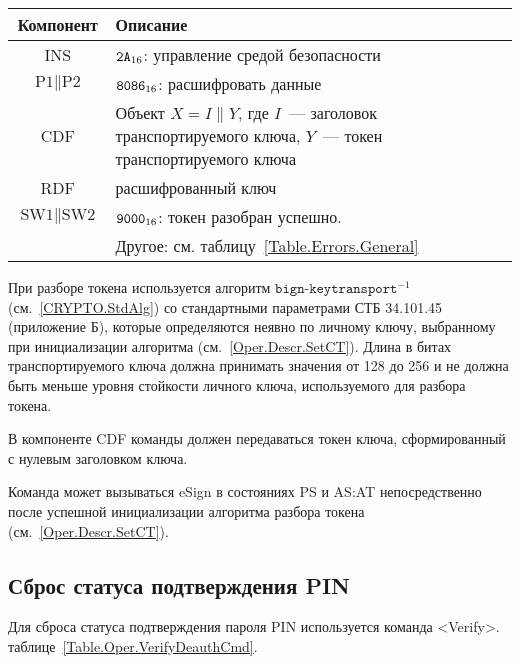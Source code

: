 \begin{table}[hbt]
\caption{}\label{Table.Oper.DecipherCmd}
\begin{tabular}{|c|p{14cm}|}
\hline
Компонент & Описание\\ 
\hline
\hline
INS & $\texttt{2A}_{16}$: управление средой безопасности \\
\hline
$\text{P1} \parallel \text{P2}$ & $\texttt{8086}_{16}$: расшифровать
данные \\ 
\hline
CDF & Объект $X=I \| Y$, где $I$~--- заголовок транспортируемого ключа, 
$Y$~--- токен транспортируемого ключа \\
\hline 
RDF &  расшифрованный ключ \\
\hline
$\text{SW1} \parallel \text{SW2}$ & $\texttt{9000}_{16}$: 
токен разобран успешно.\\
& Другое: см. таблицу~\ref{Table.Errors.General} \\
\hline
\end{tabular}
\end{table}

При разборе токена используется алгоритм $\texttt{bign-keytransport}^{-1}$
(см.~\ref{CRYPTO.StdAlg})
со стандартными параметрами СТБ 34.101.45 (приложение Б),
которые определяются неявно по личному ключу,
выбранному при инициализации алгоритма (см.~\ref{Oper.Descr.SetCT}).
Длина в битах транспортируемого ключа должна принимать значения
от 128 до 256 и не должна быть меньше уровня стойкости 
личного ключа, используемого для разбора токена.

В компоненте CDF команды должен передаваться токен ключа, 
сформированный с нулевым заголовком ключа. 

Команда может вызываться  eSign в состояниях 
PS и AS:AT непосредственно после успешной инициализации 
алгоритма разбора токена (см.~\ref{Oper.Descr.SetCT}).


\subsection{Сброс статуса подтверждения PIN}
\label{Oper.Descr.VerifyDeauth}

Для сброса статуса подтверждения пароля PIN используется команда <Verify>.
 таблице~\ref{Table.Oper.VerifyDeauthCmd}.

